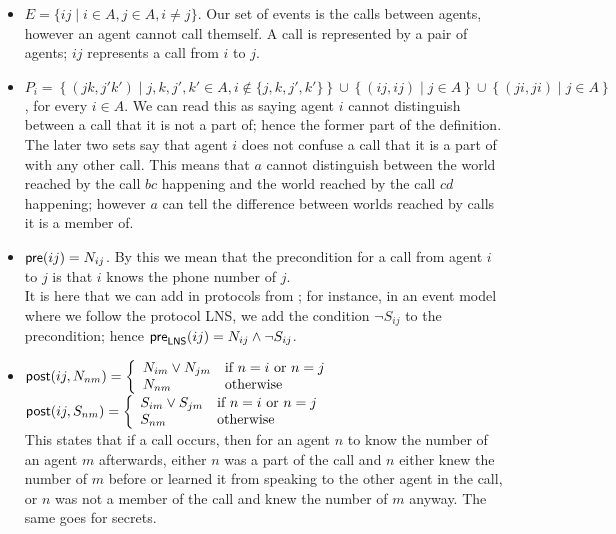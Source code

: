 \documentclass[10pt, a4paper]{report}
\begin{document}
\begin{itemize}
\item $E = \{ij \mid i \in A, j \in A, i \not = j\}$. Our set of events is the
  calls between agents, however an agent cannot call themself. A call is
  represented by a pair of agents; $ij$ represents a call from $i$ to $j$.
\item $P_i = \left\{(jk, j'k') \mid j, k, j', k' \in A, i \not \in \{j, k, j',
    k'\}\right\} \cup \left\{ (ij, ij) \mid j \in A\right\} \cup \left\{ (ji,
    ji) \mid j \in A \right\}$, for every $i \in A$. We can read this as saying
  agent $i$ cannot distinguish between a call that it is not a part of; hence
  the former part of the definition. The later two sets say that agent $i$ does
  not confuse a call that it is a part of with any other call. This means that
  $a$ cannot distinguish between the world reached by the call $bc$ happening
  and the world reached by the call $cd$ happening; however $a$ can tell the
  difference between worlds reached by calls it is a member of.
\item $\textsf{pre}(ij) = N_{ij}$. By this we mean that the precondition for a call from
  agent $i$ to $j$ is that $i$ knows the phone number of $j$. \\
  It is here that we
  can add in protocols from ; for instance, in an event
  model where we follow the protocol \textsf{LNS}, we add the condition $\neg
  S_{ij}$ to the precondition; hence $\textsf{pre}_{\textsf{LNS}}(ij) = N_{ij} \land
  \neg S_{ij}$.
\item $\textsf{post}(ij, N_{nm}) = \left\{ \begin{array}{ll}
                                     N_{im} \lor N_{jm} & \text{if $n = i$ or $n =
                                                     j$} \\
                                     N_{nm} & \text{otherwise} 
                                   \end{array}
                           \right.$ \\
$\textsf{post}(ij, S_{nm}) = \left\{ \begin{array}{ll}
                                     S_{im} \lor S_{jm} & \text{if $n = i$ or $n =
                                                     j$} \\
                                     S_{nm} & \text{otherwise} 
                                   \end{array}
                           \right.$ \\
 This states that if a call occurs, then for an agent $n$ to know the number of
 an agent $m$ afterwards, either $n$ was a part of the call and $n$ either knew the number
 of $m$ before or learned it from speaking to the other agent in the call, or
 $n$ was not a member of the call and knew the number of $m$ anyway. The same
 goes for secrets. 
\end{itemize}
\end{document}

